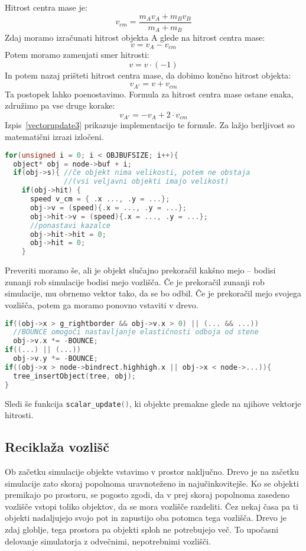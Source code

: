 \documentclass[a4paper,12pt]{article}
\begin{document}
Hitrost centra mase je: 
\[
v_{cm} = \frac{m_A v_A + m_B v_B}{m_A + m_B}
\]
Zdaj moramo izračunati hitrost objekta A glede na hitrost centra mase:
\[
v = v_A - v_{cm}
\]
Potem moramo zamenjati smer hitrosti:
\[
v = v\cdot(-1)
\]
In potem nazaj prišteti hitrost centra mase, da dobimo končno hitrost objekta:
\[
v_{A'} = v + v_{cm}
\]
Ta postopek lahko poenostavimo. Formula za hitrost centra mase ostane enaka, združimo pa vse druge korake:
\[
v_{A'} = - v_A + 2\cdot v_{cm}
\]
Izpis~\ref{vectorupdate3} prikazuje implementacijo te formule. Za lažjo berljivost so matematični izrazi izločeni.
\begin{lstlisting}[caption={\lstinline|vector_update()| -- Upoštevanje trkov}, label=vectorupdate3, language=C]
for(unsigned i = 0; i < OBJBUFSIZE; i++){
  object* obj = node->buf + i;
  if(obj->s){ //če objekt nima velikosti, potem ne obstaja 
              //(vsi veljavni objekti imajo velikost)
    if(obj->hit) {
      speed v_cm = { .x ..., .y = ...};
      obj->v = (speed){.x = ..., .y = ...};
      obj->hit->v = (speed){.x = ..., .y = ...};
      //ponastavi kazalce
      obj->hit->hit = 0;
      obj->hit = 0;
    }
\end{lstlisting}
Preveriti moramo še, ali je objekt slučajno prekoračil kakšno mejo -- bodisi zunanji rob simulacije
bodisi mejo vozlišča. Če je prekoračil zunanji rob simulacije, mu obrnemo vektor tako, da se bo odbil. Če je prekoračil
mejo svojega vozlišča, potem ga moramo ponovno vstaviti v drevo.
\begin{lstlisting}[caption={\lstinline|vector_update()| -- Odboji}, label=vectorupdate4, language=C]
if((obj->x > g_rightborder && obj->v.x > 0) || (... && ...))
  //BOUNCE omogoči nastavljanje elastičnosti odboja od stene
  obj->v.x *= -BOUNCE; 
if((...) || (...))
  obj->v.y *= -BOUNCE;
if((obj->x > node->bindrect.highhigh.x || obj->x < node->...)){
  tree_insertObject(tree, obj);
}
\end{lstlisting}
Sledi še funkcija \lstinline[language=C]{scalar_update()}, ki objekte premakne glede na njihove vektorje hitrosti.

\subsection{Reciklaža vozlišč}
Ob začetku simulacije objekte vstavimo v prostor naključno. Drevo je na začetku simulacije zato
skoraj popolnoma uravnoteženo in najučinkovitejše. Ko se objekti premikajo po prostoru, se pogosto zgodi,
da v prej skoraj popolnoma zasedeno vozlišče vstopi toliko objektov, da se mora vozlišče razdeliti. Čez nekaj
časa pa ti objekti nadaljujejo svojo pot in zapustijo oba potomca tega vozlišča. Drevo je zdaj globlje, 
tega prostora pa objekti sploh ne potrebujejo več. To upočasni delovanje simulatorja z odvečnimi, nepotrebnimi
vozlišči.
\end{document}
